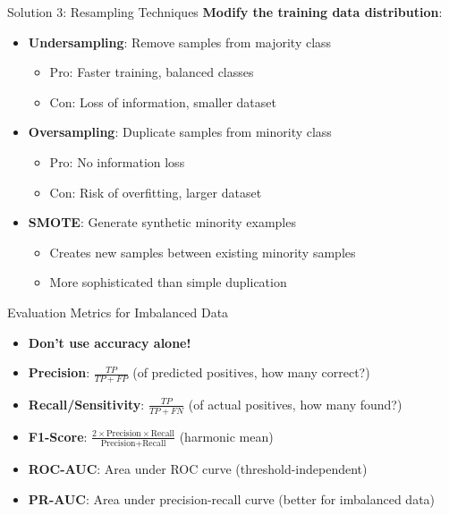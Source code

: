 \documentclass{beamer}
\begin{document}
\begin{frame}{Solution 3: Resampling Techniques}
\textbf{Modify the training data distribution}:
\begin{itemize}[<+->]
\item \textbf{Undersampling}: Remove samples from majority class
    \begin{itemize}
    \item Pro: Faster training, balanced classes
    \item Con: Loss of information, smaller dataset
    \end{itemize}
\item \textbf{Oversampling}: Duplicate samples from minority class
    \begin{itemize}
    \item Pro: No information loss
    \item Con: Risk of overfitting, larger dataset
    \end{itemize}
\item \textbf{SMOTE}: Generate synthetic minority examples
    \begin{itemize}
    \item Creates new samples between existing minority samples
    \item More sophisticated than simple duplication
    \end{itemize}
\end{itemize}
\end{frame}

\begin{frame}{Evaluation Metrics for Imbalanced Data}
\begin{itemize}[<+->]
\item \textbf{Don't use accuracy alone!}
\item \textbf{Precision}: $\frac{TP}{TP + FP}$ (of predicted positives, how many correct?)
\item \textbf{Recall/Sensitivity}: $\frac{TP}{TP + FN}$ (of actual positives, how many found?)
\item \textbf{F1-Score}: $\frac{2 \times \text{Precision} \times \text{Recall}}{\text{Precision} + \text{Recall}}$ (harmonic mean)
\item \textbf{ROC-AUC}: Area under ROC curve (threshold-independent)
\item \textbf{PR-AUC}: Area under precision-recall curve (better for imbalanced data)
\end{itemize}
\end{frame}
\end{document}
